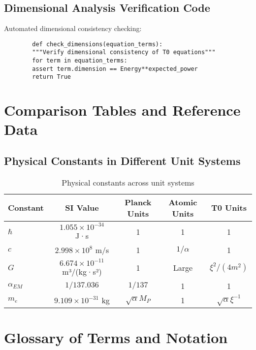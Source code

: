 \documentclass[12pt,a4paper]{article}
\begin{document}
	\subsection{Dimensional Analysis Verification Code}
	\label{app:dimensional_code}
	
	Automated dimensional consistency checking:
	\begin{verbatim}
		def check_dimensions(equation_terms):
		"""Verify dimensional consistency of T0 equations"""
		for term in equation_terms:
		assert term.dimension == Energy**expected_power
		return True
	\end{verbatim}
	
	\section{Comparison Tables and Reference Data}
	\label{app:comparison_tables}
	
	\subsection{Physical Constants in Different Unit Systems}
	\label{app:constants_table}
	
	\begin{table}[htbp]
		\centering
		\footnotesize
		\begin{tabular}{lcccc}
			\toprule
			\textbf{Constant} & \textbf{SI Value} & \textbf{Planck Units} & \textbf{Atomic Units} & \textbf{T0 Units} \\
			\midrule
			$\hbar$ & $1.055 \times 10^{-34}$ J·s & 1 & 1 & 1 \\
			$c$ & $2.998 \times 10^8$ m/s & 1 & $1/\alpha$ & 1 \\
			$G$ & $6.674 \times 10^{-11}$ m³/(kg·s²) & 1 & Large & $\xi^2/(4m^2)$ \\
			$\alpha_{EM}$ & $1/137.036$ & $1/137$ & 1 & 1 \\
			$m_e$ & $9.109 \times 10^{-31}$ kg & $\sqrt{\alpha} M_P$ & 1 & $\sqrt{\alpha} \xi^{-1}$ \\
			\bottomrule
		\end{tabular}
		\caption{Physical constants across unit systems}
		\label{tab:constants_comparison}
	\end{table}
	

	\section{Glossary of Terms and Notation}
	\label{app:glossary}
	
\end{document}
